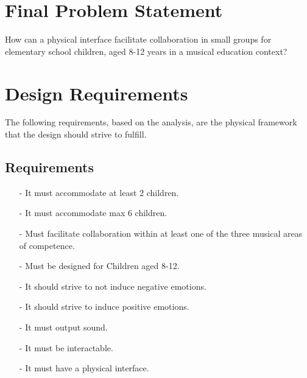 \section{Final Problem Statement}\label{sec:FPS}
	How can a physical interface facilitate collaboration in small groups for elementary school children, aged 8-12 years in a musical education context?

	
\section{Design Requirements}\label{sec:DRequirements}

The following requirements, based on the analysis, are the physical framework that the design should strive to fulfill.
	\subsection*{Requirements}
		\begin{itemize}
			\item[-] It must accommodate at least 2 children.\\
			\item[-] It must accommodate max 6 children.\\
			\item[-] Must facilitate collaboration within at least one of the three musical areas of competence.\\
			\item[-] Must be designed for Children aged 8-12.\\
			\item[-] It should strive to not induce  negative emotions.\\
			\item[-] It should strive to induce positive emotions.\\
			\item[-] It must output sound.	\\	
			\item[-] It must be interactable.\\
			\item[-] It must have a physical interface.\\
		\end{itemize}
	
















		